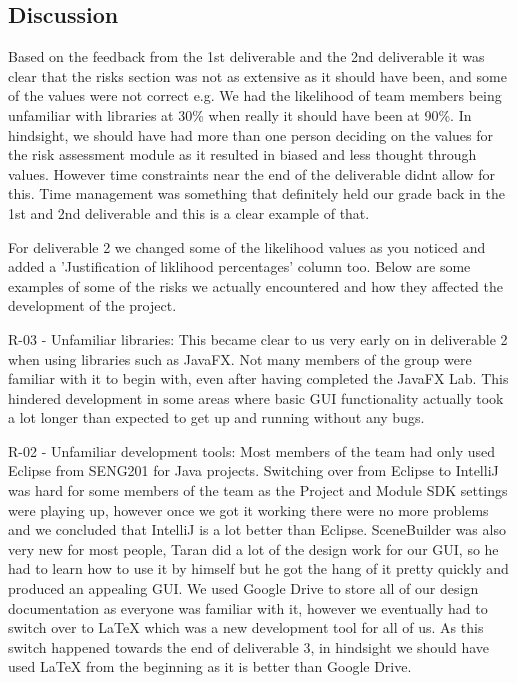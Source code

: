 \subsection{Discussion}

Based on the feedback from the 1st deliverable and the 2nd deliverable it was clear that the risks section was not as extensive as it should have been, and some of the values were not correct e.g. We had the likelihood of team members being unfamiliar with libraries at 30\% when really it should have been at 90\%. In hindsight, we should have had more than one person deciding on the values for the risk assessment module as it resulted in biased and less thought through values. However time constraints near the end of the deliverable didnt allow for this. Time management was something that definitely held our grade back in the 1st and 2nd deliverable and this is a clear example of that.

For deliverable 2 we changed some of the likelihood values as you noticed and added a 'Justification of liklihood percentages' column too. Below are some examples of some of the risks we actually encountered and how they affected the development of the project.

R-03 - Unfamiliar libraries: This became clear to us very early on in deliverable 2 when using libraries such as JavaFX. Not many members of the group were familiar with it to begin with, even after having completed the JavaFX Lab. This hindered development in some areas where basic GUI functionality actually took a lot longer than expected to get up and running without any bugs.

R-02 - Unfamiliar development tools: Most members of the team had only used Eclipse from SENG201 for Java projects. Switching over from Eclipse to IntelliJ was hard for some members of the team as the Project and Module SDK settings were playing up, however once we got it working there were no more problems and we concluded that IntelliJ is a lot better than Eclipse.
SceneBuilder was also very new for most people, Taran did a lot of the design work for our GUI, so he had to learn how to use it by himself but he got the hang of it pretty quickly and produced an appealing GUI.
We used Google Drive to store all of our design documentation as everyone was familiar with it, however we eventually had to switch over to LaTeX which was a new development tool for all of us. As this switch happened towards the end of deliverable 3, in hindsight we should have used LaTeX from the beginning as it is better than Google Drive.

